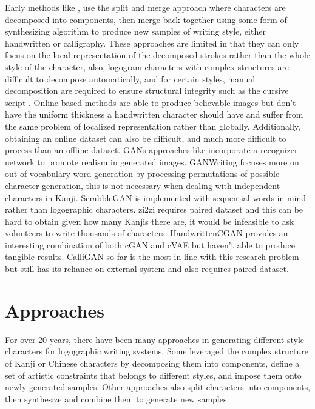 \documentclass[12pt]{report}
\begin{document}
Early methods like \cite{automatic-calligraphy}, \cite{automatic-handwritten} use the split and merge approach where characters are decomposed into components, then merge back together using some form of synthesizing algorithm to produce new samples of writing style, either handwritten or calligraphy. These approaches are limited in that they can only focus on the local representation of the decomposed strokes rather than the whole style of the character, also, logogram characters with complex structures are difficult to decompose automatically, and for certain styles, manual decomposition are required to ensure structural integrity such as the cursive script \cite{intel-system}.
Online-based methods \cite{online-kanji} \cite{online-kanji-2} are able to produce believable images but don’t have the uniform thickness a handwritten character should have and suffer from the same problem of localized representation rather than globally. Additionally, obtaining an online dataset can also be difficult, and much more difficult to process than an offline dataset.
GANs approaches like \cite{zi2zi}\cite{handwritten-cgan}\cite{calligan}\cite{scrabble-gan}\cite{gan-writting} incorporate a recognizer network to promote realism in generated images. GANWriting\cite{gan-writting} focuses more on out-of-vocabulary word generation by processing permutations of possible character generation, this is not necessary when dealing with independent characters in Kanji. ScrabbleGAN \cite{scrabble-gan} is implemented with sequential words in mind rather than logographic characters. zi2zi \cite{zi2zi} requires paired dataset and this can be hard to obtain given how many Kanjis there are, it would be infeasible to ask volunteers to write thousands of characters. HandwrittenCGAN \cite{handwritten-cgan} provides an interesting combination of both cGAN \cite{cgan} and cVAE \cite{cvae} but haven’t able to produce tangible results. CalliGAN \cite{calligan} so far is the most in-line with this research problem but still has its reliance on external system \cite{casia} and also requires paired dataset.

\section{Approaches}
For over 20 years, there have been many approaches in generating different style characters for logographic writing systems. Some leveraged the complex structure of Kanji or Chinese characters by decomposing them into components, define a set of artistic constraints that belongs to different styles, and impose them onto newly generated samples. Other approaches also split characters into components, then synthesize and combine them to generate new samples.
\end{document}
